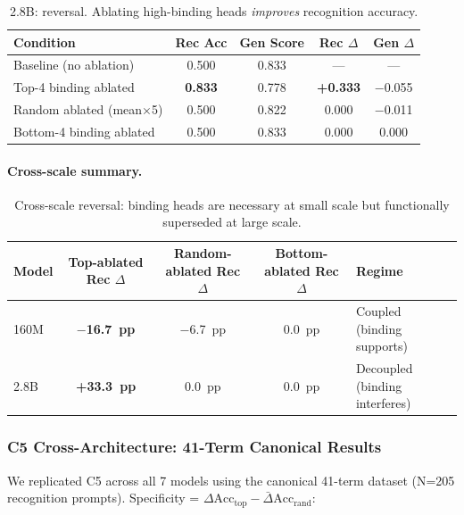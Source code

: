 \documentclass[10pt]{article} %
\begin{document}
\begin{table}[h]
\centering
\begin{tabular}{|l|c|c|c|c|}
\hline
\textbf{Condition} & \textbf{Rec Acc} & \textbf{Gen Score} & \textbf{Rec $\Delta$} & \textbf{Gen $\Delta$} \\
\hline
Baseline (no ablation) & 0.500 & 0.833 & --- & --- \\
Top-4 binding ablated & \textbf{0.833} & 0.778 & \textbf{+0.333} & $-$0.055 \\
Random ablated (mean$\times$5) & 0.500 & 0.822 & 0.000 & $-$0.011 \\
Bottom-4 binding ablated & 0.500 & 0.833 & 0.000 & 0.000 \\
\hline
\end{tabular}
\caption{2.8B: reversal. Ablating high-binding heads \emph{improves} recognition accuracy.}
\label{tab:c5_28b_ablation}
\end{table}

\paragraph{Cross-scale summary.}\mbox{}

\begin{table}[h]
\centering
\begin{tabular}{|l|c|c|c|p{1.8cm}|}
\hline
\textbf{Model} & \textbf{Top-ablated Rec $\Delta$} & \textbf{Random-ablated Rec $\Delta$} & \textbf{Bottom-ablated Rec $\Delta$} & \textbf{Regime} \\
\hline
160M & \textbf{$-$16.7~pp} & $-$6.7~pp & 0.0~pp & Coupled (binding supports) \\
2.8B & \textbf{+33.3~pp} & 0.0~pp & 0.0~pp & Decoupled (binding interferes) \\
\hline
\end{tabular}
\caption{Cross-scale reversal: binding heads are necessary at small scale but functionally superseded at large scale.}
\label{tab:c5_cross_scale}
\end{table}

\subsubsection{C5 Cross-Architecture: 41-Term Canonical Results}

We replicated C5 across all 7 models using the canonical 41-term dataset (N=205 recognition prompts).
Specificity = $\Delta\text{Acc}_\text{top} - \bar{\Delta}\text{Acc}_\text{rand}$:
\end{document}

